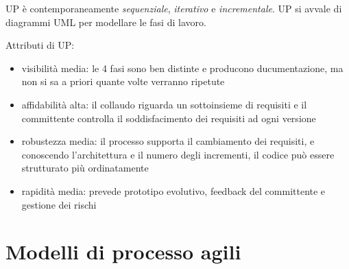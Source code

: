 \documentclass[11pt]{article}
\begin{document}
UP è contemporaneamente \textit{sequenziale}, \textit{iterativo} e \textit{incrementale}. UP si avvale di diagrammi UML 
per modellare le fasi di lavoro.

Attributi di UP:
\begin{itemize}
    \item visibilità media: le 4 fasi sono ben distinte e producono ducumentazione, ma non si sa a priori quante volte 
    verranno ripetute
    \item affidabilità alta: il collaudo riguarda un sottoinsieme di requisiti e il committente controlla il soddisfacimento 
    dei requisiti ad ogni versione 
    \item robustezza media: il processo supporta il cambiamento dei requisiti, e conoscendo l'architettura e il numero 
    degli incrementi, il codice può essere strutturato più ordinatamente
    \item rapidità media: prevede prototipo evolutivo, feedback del committente e gestione dei rischi
\end{itemize}
\section{Modelli di processo agili}
\end{document}
